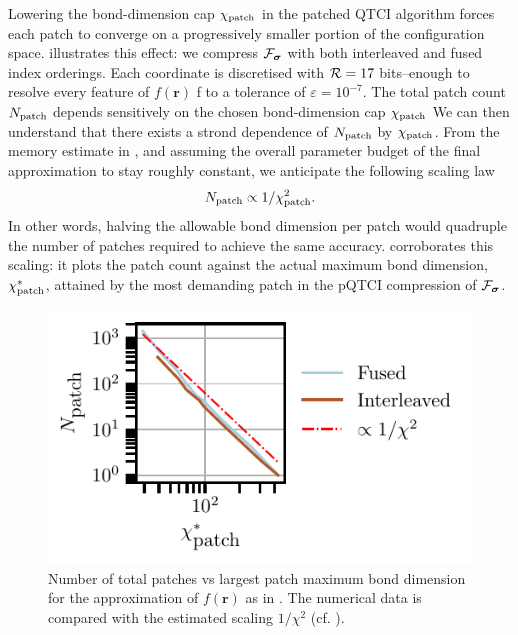 Lowering the bond-dimension cap $\chi_{\text{patch}}$ in the patched QTCI algorithm forces each patch to converge on a progressively smaller portion of the configuration space. illustrates this effect: we compress $\mathcal{F}_{\boldsymbol{\sigma}}$ with both interleaved and fused index orderings. Each coordinate is discretised with $\mathcal{R} = 17$ bits--enough to resolve every feature of $f(\boldsymbol{r})$
f to a tolerance of $\varepsilon=10^{-7}$.
The total patch count $N_{\text{patch}}$ depends sensitively on the chosen bond-dimension cap $\chi_{\text{patch}}$
We can then understand that there exists a strond dependence of $N_{\text{patch}}$ by $\chi_{\text{patch}}$. From the memory estimate in , and assuming the overall parameter budget of the final approximation to stay roughly constant, we anticipate the following scaling law
\begin{equation}
	N_{\text{patch}} \propto 1 / \chi_{\text{patch}}^2. 
	\label{eq:scalingNpatchBonddim}
\end{equation}
In other words, halving the allowable bond dimension per patch would quadruple the number of patches required to achieve the same accuracy.
 corroborates this scaling: it plots the patch count against the actual maximum bond dimension, $\chi_{\text{patch}}^*$\footnotemark, attained by the most demanding patch in the pQTCI compression of $\mathcal{F}_{\boldsymbol{\sigma}}$.
\begin{figure}[ht!]
	\centering
	\includegraphics{figures/localFunc_Npatch_vs_Chipatch.pdf}
	\caption{Number of total patches vs largest patch maximum bond dimension for the approximation of $f(\boldsymbol{r})$ as in . The numerical data is compared with the estimated scaling $1/\chi^2$ (cf. ).}
	\label{fig:NpatchvsChipatch}
\end{figure}

